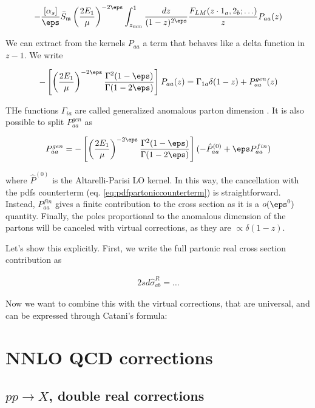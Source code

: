 \documentclass[11pt]{report}
\begin{document}
\begin{align}
    -\frac{[\alpha_s]}{\eps}\bar{S}_{\mathfrak{m}}\left(\frac{2E_1}{\mu}\right)^{-2\eps}\int_{z_{\min}}^1 \frac{dz}{(1-z)^{2\eps}} \frac{F_{LM}(z\cdot1_a,2_b;\ldots)}{z}P_{aa}(z)
\end{align}

We can extract from the kernels \(P_{aa}\) a term that behaves like a delta function in \(z-1\). We write 

\begin{align}
    -\left[ \left( \frac{2E_1}{\mu} \right)^{-2\eps}\frac{\Gamma^2(1-\eps)}{\Gamma(1-2\eps)} \right]P_{aa}(z) = \Gamma_{1a}\delta(1-z) + P_{aa}^{gen}(z)
\end{align}

THe functions \(\Gamma_{ia}\) are called generalized anomalous parton dimension . It is also possible to split \(P_{aa}^{gen}\) as

\begin{align}
    P_{aa}^{gen} = -\left[ \left( \frac{2E_1}{\mu} \right)^{-2\eps}\frac{\Gamma^2(1-\eps)}{\Gamma(1-2\eps)} \right](-\hat{P}^{(0)}_{aa} + \eps P^{fin}_{aa})
\end{align}

where \(\hat{P}^{(0)}\) is the Altarelli-Parisi LO kernel. In this way, the cancellation with the pdfs counterterm (eq. \ref{eq:pdfpartoniccounterterm}) is straightforward. Instead, \(P^{fin}_{aa}\) gives a finite contribution to the cross section as it is a \(o(\eps^0)\) quantity. Finally, the poles proportional to the anomalous dimension of the partons will be canceled with virtual corrections, as they are \(\propto \delta(1-z)\). 

Let's show this explicitly. First, we write the full partonic real cross section contribution as 

\begin{align}
    2sd\hat{\sigma}^R_{ab} = \ldots 
\end{align}

Now we want to combine this with the virtual corrections, that are universal, and can be expressed through Catani's formula: 


\chapter{NNLO QCD corrections}

\section{\(pp \to X\), double real corrections}
\end{document}
